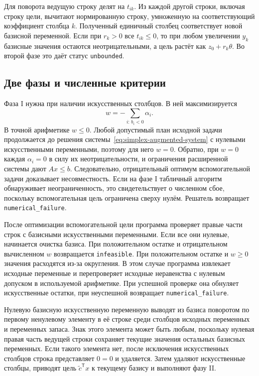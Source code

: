 Для поворота ведущую строку делят на $t_{ik}$. Из каждой другой строки,
включая строку цели, вычитают нормированную строку, умноженную на
соответствующий коэффициент столбца $k$. Полученный единичный столбец
соответствует новой базисной переменной. Если при $r_k>0$ все
$t_{ik}\leq0$, то при любом увеличении $y_k$ базисные значения
остаются неотрицательными, а цель растёт как $z_0+r_k\theta$.
Во второй фазе это даёт статус \texttt{unbounded}.

\subsection{Две фазы и численные критерии}

Фаза I нужна при наличии искусственных столбцов. В ней максимизируется
\begin{equation}
  w=-\sum_{i:\,b_i<0}\alpha_i .
  \label{eq:simplex-auxiliary-objective}
\end{equation}
В точной арифметике $w\leq0$. Любой допустимый план исходной задачи
продолжается до решения системы~\eqref{eq:simplex-augmented-system}
с нулевыми искусственными переменными, поэтому для него $w=0$.
Обратно, при $w=0$ каждая $\alpha_i=0$ в силу их неотрицательности,
и ограничения расширенной системы дают $Ax\leq b$. Следовательно,
отрицательный оптимум вспомогательной задачи доказывает несовместность.
Если на фазе I табличный алгоритм обнаруживает неограниченность,
это свидетельствует о численном сбое, поскольку вспомогательная цель
ограничена сверху нулём. Решатель возвращает \texttt{numerical\_failure}.

После оптимизации вспомогательной цели программа проверяет правые
части строк с базисными искусственными переменными. Если все они
нулевые, начинается очистка базиса. При положительном остатке и
отрицательном вычисленном $w$ возвращается \texttt{infeasible}.
При положительном остатке и $w\geq0$ значения расходятся из-за
округления. В этом случае программа извлекает исходные переменные и
перепроверяет исходные неравенства с нулевым допуском в используемой
арифметике. При успешной проверке она обнуляет искусственные остатки,
при неуспешной возвращает \texttt{numerical\_failure}.

Нулевую базисную искусственную переменную выводят из базиса поворотом
по первому ненулевому элементу в её строке среди столбцов исходных
переменных и переменных запаса. Знак этого элемента может быть любым,
поскольку нулевая правая часть ведущей строки сохраняет текущие
значения остальных базисных переменных. Если такого элемента нет,
после исключения искусственных столбцов строка представляет $0=0$
и удаляется. Затем удаляют искусственные столбцы, приводят цель
$\tilde c^{\mathsf T}x$ к текущему базису и выполняют фазу II.

